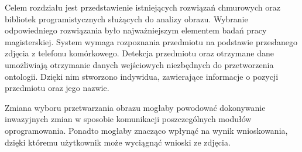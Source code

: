 Celem rozdziału jest przedstawienie istniejących rozwiązań chmurowych oraz bibliotek programistycznych służących do analizy obrazu. Wybranie odpowiedniego rozwiązania było najważniejszym elementem badań pracy magisterskiej. System wymaga rozpoznania przedmiotu na podstawie przesłanego zdjęcia z telefonu komórkowego. Detekcja przedmiotu oraz otrzymane dane umożliwiają otrzymanie danych wejściowych niezbędnych do przetworzenia ontologii. Dzięki nim stworzono indywidua, zawierające informacje o pozycji przedmiotu oraz jego nazwie. 

Zmiana wyboru przetwarzania obrazu mogłaby powodować dokonywanie inwazyjnych zmian w sposobie komunikacji poszczególnych modułów oprogramowania. Ponadto mogłaby znacząco wpłynąć na wynik wnioskowania, dzięki któremu użytkownik może wyciągnąć wnioski ze zdjęcia.

